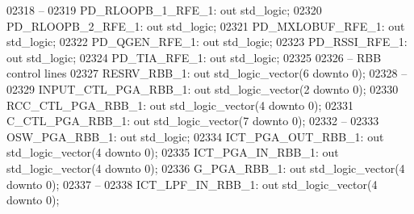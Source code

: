 \begin{DoxyCode}
02318 \textcolor{keyword}{    --}
02319     PD\_RLOOPB\_1\_RFE\_1:  \textcolor{keywordflow}{out} \textcolor{comment}{std\_logic};
02320     PD\_RLOOPB\_2\_RFE\_1:  \textcolor{keywordflow}{out} \textcolor{comment}{std\_logic};
02321     PD\_MXLOBUF\_RFE\_1:   \textcolor{keywordflow}{out} \textcolor{comment}{std\_logic};
02322     PD\_QGEN\_RFE\_1:  \textcolor{keywordflow}{out} \textcolor{comment}{std\_logic};
02323     PD\_RSSI\_RFE\_1:  \textcolor{keywordflow}{out} \textcolor{comment}{std\_logic};
02324     PD\_TIA\_RFE\_1:   \textcolor{keywordflow}{out} \textcolor{comment}{std\_logic};
02325 
02326 \textcolor{keyword}{    -- RBB control lines }
02327     RESRV\_RBB\_1:    \textcolor{keywordflow}{out} \textcolor{comment}{std\_logic\_vector}(\textcolor{vhdllogic}{}\textcolor{vhdllogic}{6} \textcolor{keywordflow}{downto} \textcolor{vhdllogic}{}\textcolor{vhdllogic}{0});
02328 \textcolor{keyword}{    --}
02329     INPUT\_CTL\_PGA\_RBB\_1:    \textcolor{keywordflow}{out} \textcolor{comment}{std\_logic\_vector}(\textcolor{vhdllogic}{}\textcolor{vhdllogic}{2} \textcolor{keywordflow}{downto} \textcolor{vhdllogic}{}\textcolor{vhdllogic}{0});
02330     RCC\_CTL\_PGA\_RBB\_1:  \textcolor{keywordflow}{out} \textcolor{comment}{std\_logic\_vector}(\textcolor{vhdllogic}{}\textcolor{vhdllogic}{4} \textcolor{keywordflow}{downto} \textcolor{vhdllogic}{}\textcolor{vhdllogic}{0});
02331     C\_CTL\_PGA\_RBB\_1:    \textcolor{keywordflow}{out} \textcolor{comment}{std\_logic\_vector}(\textcolor{vhdllogic}{}\textcolor{vhdllogic}{7} \textcolor{keywordflow}{downto} \textcolor{vhdllogic}{}\textcolor{vhdllogic}{0});
02332 \textcolor{keyword}{    --}
02333     OSW\_PGA\_RBB\_1:  \textcolor{keywordflow}{out} \textcolor{comment}{std\_logic};
02334     ICT\_PGA\_OUT\_RBB\_1:  \textcolor{keywordflow}{out} \textcolor{comment}{std\_logic\_vector}(\textcolor{vhdllogic}{}\textcolor{vhdllogic}{4} \textcolor{keywordflow}{downto} \textcolor{vhdllogic}{}\textcolor{vhdllogic}{0});
02335     ICT\_PGA\_IN\_RBB\_1:   \textcolor{keywordflow}{out} \textcolor{comment}{std\_logic\_vector}(\textcolor{vhdllogic}{}\textcolor{vhdllogic}{4} \textcolor{keywordflow}{downto} \textcolor{vhdllogic}{}\textcolor{vhdllogic}{0});
02336     G\_PGA\_RBB\_1:    \textcolor{keywordflow}{out} \textcolor{comment}{std\_logic\_vector}(\textcolor{vhdllogic}{}\textcolor{vhdllogic}{4} \textcolor{keywordflow}{downto} \textcolor{vhdllogic}{}\textcolor{vhdllogic}{0});
02337 \textcolor{keyword}{    --}
02338     ICT\_LPF\_IN\_RBB\_1:   \textcolor{keywordflow}{out} \textcolor{comment}{std\_logic\_vector}(\textcolor{vhdllogic}{}\textcolor{vhdllogic}{4} \textcolor{keywordflow}{downto} \textcolor{vhdllogic}{}\textcolor{vhdllogic}{0});

\end{DoxyCode}
